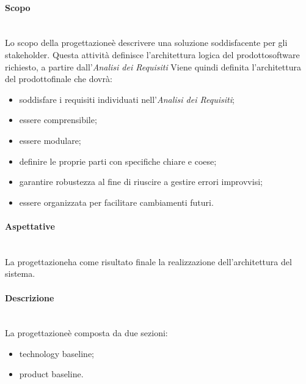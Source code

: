 \paragraph*{Scopo}\mbox{}\\ [1mm]
Lo scopo della progettazione\glosp è descrivere una soluzione soddisfacente per gli stakeholder\glo. Questa attività definisce l'architettura logica del prodotto\glosp software richiesto, a partire dall'\textit{Analisi dei Requisiti}
Viene quindi definita l'architettura del prodotto\glosp finale che dovrà:
\begin{itemize}
	\item soddisfare i requisiti individuati nell'\textit{Analisi dei Requisiti};
	\item essere comprensibile;
	\item essere modulare;
	\item definire le proprie parti con specifiche chiare e coese;
	\item garantire robustezza al fine di riuscire a gestire errori improvvisi;
	\item essere organizzata per facilitare cambiamenti futuri.
\end{itemize}
\paragraph*{Aspettative}\mbox{}\\ [1mm]
La progettazione\glosp ha come risultato finale la realizzazione dell'architettura del sistema.
\paragraph*{Descrizione}\mbox{}\\ [1mm]
La progettazione\glosp è composta da due sezioni:
\begin{itemize}
	\item technology baseline\glo;
	\item product baseline\glo.	
\end{itemize}
